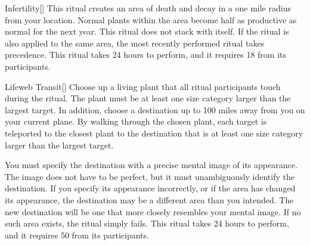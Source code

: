 \lowercase{\hypertarget{spell:Infertility}{}}\label{spell:Infertility}
\begin{freeability}[Rank 3]{\hypertarget{spell:Infertility}{Infertility}}[]
\targetrule
This ritual creates an area of death and decay in a one mile radius  from your location.
Normal plants within the area become half as productive as normal for the next year.
This ritual does not stack with itself.
If the  ritual is also applied to the same area, the most recently performed ritual takes precedence.
This ritual takes 24 hours to perform, and it requires 18  from its participants.
\end{freeability}
\vspace{0.25em}



\lowercase{\hypertarget{spell:Lifeweb Transit}{}}\label{spell:Lifeweb Transit}
\begin{freeability}[Rank 5]{\hypertarget{spell:Lifeweb Transit}{Lifeweb Transit}}[]
Choose up a living plant that all ritual participants touch during the ritual.
The plant must be at least one size category larger than the largest target.
In addition, choose a destination up to 100 miles away from you on your current plane.
By walking through the chosen plant, each target is teleported to the closest plant to the destination that is at least one size category larger than the largest target.

You must specify the destination with a precise mental image of its appearance.
The image does not have to be perfect, but it must unambiguously identify the destination.
If you specify its appearance incorrectly, or if the area has changed its appearance, the destination may be a different area than you intended.
The new destination will be one that more closely resembles your mental image.
If no such area exists, the ritual simply fails.
This ritual takes 24 hours to perform, and it requires 50  from its participants.
\end{freeability}
\vspace{0.25em}


